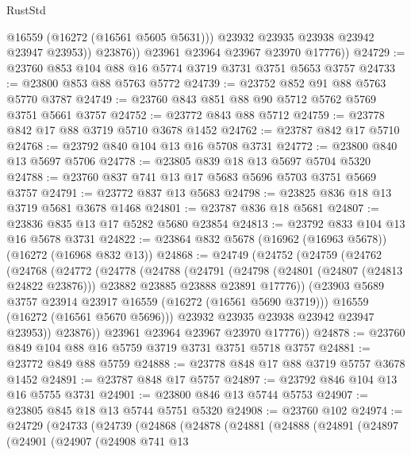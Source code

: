 \begin{lexlean}{RustStd}
\begin{coremodule}
                  @16559
                  (@16272 (@16561 @5605 @5631)))
                @23932
                @23935
                @23938
                @23942
                @23947
                @23953))
            @23876))
        @23961
        @23964
        @23967
        @23970
        @17776))
@24729 := @23760 @853 @104 @88 @16 @5774 @3719 @3731 @3751 @5653 @3757
@24733 := @23800 @853 @88 @5763 @5772
@24739 := @23752 @852 @91 @88 @5763 @5770 @3787
@24749 := @23760 @843 @851 @88 @90 @5712 @5762 @5769 @3751 @5661 @3757
@24752 := @23772 @843 @88 @5712
@24759 := @23778 @842 @17 @88 @3719 @5710 @3678 @1452
@24762 := @23787 @842 @17 @5710
@24768 := @23792 @840 @104 @13 @16 @5708 @3731
@24772 := @23800 @840 @13 @5697 @5706
@24778 := @23805 @839 @18 @13 @5697 @5704 @5320
@24788 := @23760 @837 @741 @13 @17 @5683 @5696 @5703 @3751 @5669 @3757
@24791 := @23772 @837 @13 @5683
@24798 := @23825 @836 @18 @13 @3719 @5681 @3678 @1468
@24801 := @23787 @836 @18 @5681
@24807 := @23836 @835 @13 @17 @5282 @5680 @23854
@24813 := @23792 @833 @104 @13 @16 @5678 @3731
@24822 := @23864 @832 @5678 (@16962 (@16963 @5678)) (@16272 (@16968 @832 @13))
@24868 := @24749
    (@24752
      (@24759
        (@24762
          (@24768
            (@24772
              (@24778
                (@24788
                  (@24791
                    (@24798
                      (@24801 (@24807 (@24813 @24822 @23876)))
                      @23882
                      @23885
                      @23888
                      @23891
                      @17776))
                  (@23903 @5689 @3757 @23914 @23917 @16559 (@16272 (@16561 @5690 @3719)))
                  @16559
                  (@16272 (@16561 @5670 @5696)))
                @23932
                @23935
                @23938
                @23942
                @23947
                @23953))
            @23876))
        @23961
        @23964
        @23967
        @23970
        @17776))
@24878 := @23760 @849 @104 @88 @16 @5759 @3719 @3731 @3751 @5718 @3757
@24881 := @23772 @849 @88 @5759
@24888 := @23778 @848 @17 @88 @3719 @5757 @3678 @1452
@24891 := @23787 @848 @17 @5757
@24897 := @23792 @846 @104 @13 @16 @5755 @3731
@24901 := @23800 @846 @13 @5744 @5753
@24907 := @23805 @845 @18 @13 @5744 @5751 @5320
@24908 := @23760 @102
@24974 := @24729
    (@24733
      (@24739
        (@24868
          (@24878
            (@24881
              (@24888
                (@24891
                  (@24897
                    (@24901
                      (@24907
                        (@24908
                          @741
                          @13

\end{coremodule}
\end{lexlean}
